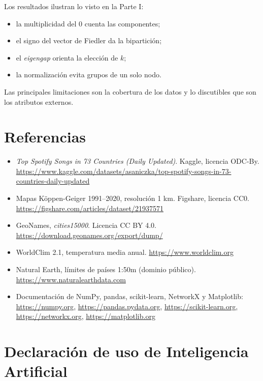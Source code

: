 \documentclass[11pt,a4paper]{article}
\begin{document}
Los resultados ilustran lo visto en la Parte I:
\begin{itemize}[leftmargin=1.5em]
\item la multiplicidad del $0$ cuenta las componentes;
\item el signo del vector de Fiedler da la bipartición;
\item el \emph{eigengap} orienta la elección de $k$;
\item la normalización evita grupos de un solo nodo.
\end{itemize}
Las principales limitaciones son la cobertura de los datos y lo discutibles que son los atributos externos.

\section*{Referencias}
\begin{itemize}[leftmargin=1.5em]
\item \emph{Top Spotify Songs in 73 Countries (Daily Updated)}. Kaggle, licencia ODC-By. \url{https://www.kaggle.com/datasets/asaniczka/top-spotify-songs-in-73-countries-daily-updated}
\item Mapas Köppen-Geiger 1991--2020, resolución 1 km. Figshare, licencia CC0. \url{https://figshare.com/articles/dataset/21937571}
\item GeoNames, \emph{cities15000}. Licencia CC BY 4.0. \url{https://download.geonames.org/export/dump/}
\item WorldClim 2.1, temperatura media anual. \url{https://www.worldclim.org}
\item Natural Earth, límites de países 1:50m (dominio público). \url{https://www.naturalearthdata.com}
\item Documentación de NumPy, pandas, scikit-learn, NetworkX y Matplotlib: \url{https://numpy.org}, \url{https://pandas.pydata.org}, \url{https://scikit-learn.org}, \url{https://networkx.org}, \url{https://matplotlib.org}
\end{itemize}

\section*{Declaración de uso de Inteligencia Artificial}
\end{document}
